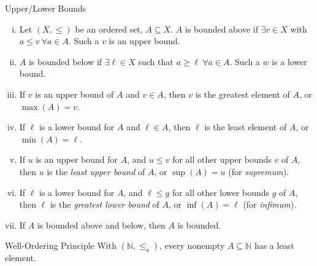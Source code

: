 \documentclass[8pt]{extarticle}
\newcommand{\N}{\mathbb{N}}
\begin{document}
  \begin{problem}{Upper/Lower Bounds}
    \begin{enumerate}[(i)]
      \item Let $(X,\leq)$ be an ordered set, $A\subseteq X$. $A$ is bounded above if $\exists v\in X$ with $a\leq v~\forall a\in A$. Such a $v$ is an upper bound.
      \item $A$ is bounded below if $\exists \ell\in X$ such that $a\geq \ell~\forall a\in A$. Such a $w$ is a lower bound.
      \item If $v$ is an upper bound of $A$ and $v\in A$, then $v$ is the greatest element of $A$, or $\max(A) = v$.
      \item If $\ell$ is a lower bound for $A$ and $\ell\in A$, then $\ell$ is the least element of $A$, or $\min(A) = \ell$.
      \item If $u$ is an upper bound for $A$, and $u \leq v$ for all other upper bounds $v$ of $A$, then $u$ is the \textit{least upper bound} of $A$, or $\sup(A) = u$ (for \textit{supremum}).
      \item If $\ell$ is a lower bound for $A$, and $\ell \leq g$ for all other lower bounds $g$ of $A$, then $\ell$ is the \textit{greatest lower bound} of $A$, or $\inf(A) = \ell$ (for \textit{infimum}).
      \item If $A$ is bounded above and below, then $A$ is bounded.
    \end{enumerate}
  \end{problem}
  \begin{problem}{Well-Ordering Principle}
    With $(\N,\leq_a)$, every nonempty $A\subseteq \N$ has a least element.
  \end{problem}
\end{document}
